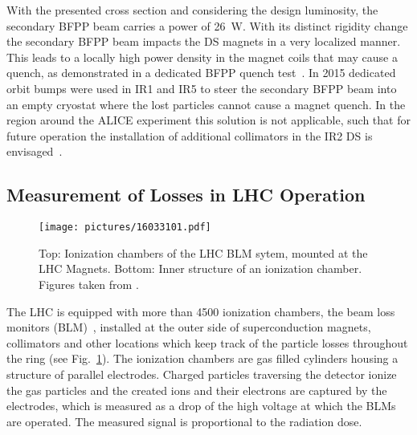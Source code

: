 %
With the presented cross section and considering the design luminosity, the secondary BFPP beam carries a power of 26~W. With its distinct rigidity change the secondary BFPP beam impacts the DS magnets in a very localized manner. This leads to a locally high power density in the magnet coils that may cause a quench, as demonstrated in a dedicated BFPP quench test~\cite{}. In 2015 dedicated orbit bumps were used in IR1 and IR5 to steer the secondary BFPP beam into an empty cryostat where the lost particles cannot cause a magnet quench. In the region around the ALICE experiment this solution is not applicable, such that for future operation the installation of additional collimators in the IR2 DS is envisaged~\cite{}. 


%



\subsection{Measurement of Losses in LHC Operation}
%
\begin{figure}[b]  
    \centering
    \texttt{[image: pictures/16033101.pdf]}
    \caption{Top: Ionization chambers of the LHC BLM sytem, mounted at the LHC Magnets. Bottom: Inner structure of an ionization chamber. Figures taken from \cite{BLM_homepage}.}  
    \label{pic:16033101}
\end{figure}

The LHC is equipped with more than 4500 ionization chambers, the beam loss monitors (BLM)~\cite{BLMref1,BLMref02}, installed at the outer side of superconduction magnets, collimators and other locations which keep track of the particle losses throughout the ring (see Fig.~\ref{pic:16033101}). The ionization chambers are gas filled cylinders housing a structure of parallel electrodes. Charged particles traversing the detector ionize the gas particles and the created ions and their electrons are captured by the electrodes, which is measured as a drop of the high voltage at which the BLMs are operated. The measured signal is proportional to the radiation dose.
%
%
%


